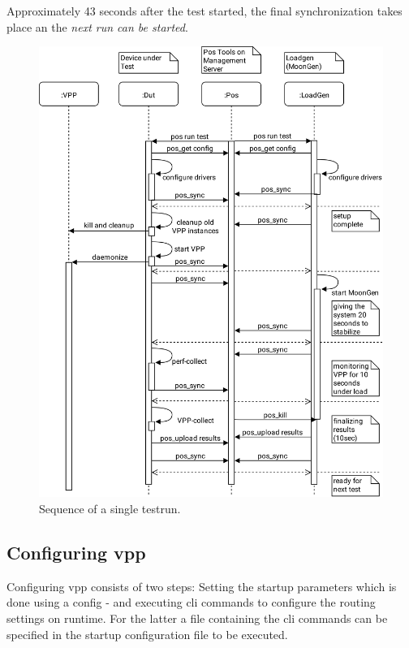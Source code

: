 Approximately 43 seconds after the test started, the final
synchronization takes place an the \textit{next run can be started}.

\begin{figure}[!ht]
\noindent\hspace{0.5mm}\includegraphics[width=\linewidth]{pics/procedure-sequence.png}
\caption{Sequence of a single testrun. }
\label{testsequence}
\end{figure}


\subsection{Configuring \Ac{vpp}}


Configuring \Ac{vpp} consists of two steps: Setting the startup
parameters which is done using a \Ac{config} - and executing \Ac{cli}
commands to configure the routing settings on runtime. For the latter
a file containing the \Ac{cli} commands can be specified in the
startup configuration file to be executed. 

